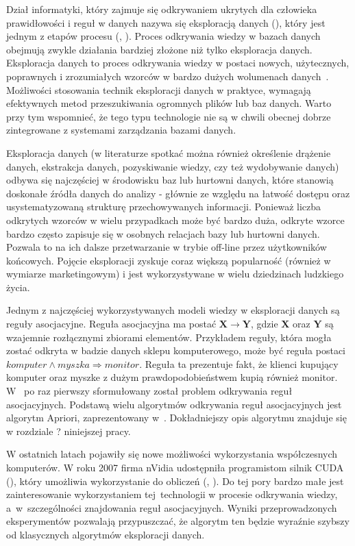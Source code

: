 Dział informatyki, który zajmuje się odkrywaniem ukrytych dla człowieka prawidłowości i reguł w danych nazywa się eksploracją danych (), który jest jednym z etapów procesu  (, ). Proces odkrywania wiedzy w bazach danych obejmują zwykle działania bardziej złożone niż tylko eksploracja danych. Eksploracja danych to proces odkrywania wiedzy w postaci nowych, użytecznych, poprawnych i zrozumiałych wzorców w bardzo dużych wolumenach danych~\cite{DataMiningStart}. Możliwości stosowania technik eksploracji danych w praktyce, wymagają efektywnych metod przeszukiwania ogromnych plików lub baz danych. Warto przy tym wspomnieć, że tego typu technologie nie są w chwili obecnej dobrze zintegrowane z systemami zarządzania bazami danych.

Eksploracja danych (w literaturze spotkać można również określenie drążenie danych, ekstrakcja danych, pozyskiwanie wiedzy, czy też wydobywanie danych) odbywa się najczęściej w środowisku baz lub hurtowni danych, które stanowią doskonałe źródła danych do analizy - głównie ze względu na łatwość dostępu oraz usystematyzowaną strukturę przechowywanych informacji. Ponieważ liczba odkrytych wzorców w wielu przypadkach może być bardzo duża, odkryte wzorce bardzo często zapisuje się w osobnych relacjach bazy lub hurtowni danych. Pozwala to na ich dalsze przetwarzanie w trybie off-line przez użytkowników końcowych. Pojęcie eksploracji zyskuje coraz większą popularność (również w wymiarze marketingowym) i jest wykorzystywane w wielu dziedzinach ludzkiego życia.

Jednym z najczęściej wykorzystywanych modeli wiedzy w eksploracji danych są reguły asocjacyjne. Reguła asocjacyjna ma postać $\mathbf{X} \to \mathbf{Y}$, gdzie $\mathbf{X}$ oraz $\mathbf{Y}$ są wzajemnie rozłącznymi zbiorami elementów. Przykładem reguły, która mogła zostać odkryta w badzie danych sklepu komputerowego, może być reguła postaci $komputer \land myszka \Rightarrow monitor$. Reguła ta prezentuje fakt, że klienci kupujący komputer oraz myszke z dużym prawdopodobieństwem kupią również monitor. W~\cite{AssRulesStrt} po raz pierwszy sformułowany został problem odkrywania reguł asocjacyjnych. Podstawą wielu algorytmów odkrywania reguł asocjacyjnych jest algorytm Apriori, zaprezentowany w~\cite{Problem:Statement}. Dokładniejszy opis algorytmu znajduje się w rozdziale ? niniejszej pracy.

W ostatnich latach pojawiły się nowe możliwości wykorzystania współczesnych komputerów. W roku 2007 firma nVidia udostępniła programistom silnik CUDA (), który umożliwia wykorzystanie do obliczeń  (, ). Do tej pory bardzo małe jest zainteresowanie wykorzystaniem tej~technologii w procesie odkrywania wiedzy, a~w~szczególności znajdowania reguł asocjacyjnych. Wyniki przeprowadzonych eksperymentów pozwalają przypuszczać, że algorytm ten będzie wyraźnie szybszy od klasycznych algorytmów eksploracji danych.

